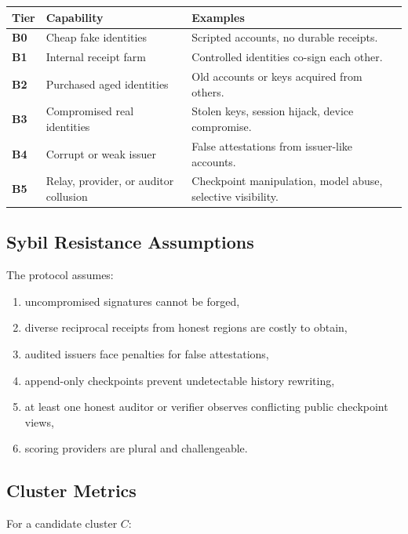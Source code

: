 \documentclass[11pt]{article}
\begin{document}
\begin{center}
\begin{tabularx}{\textwidth}{>{\bfseries}p{} p{} X}
\toprule
Tier & Capability & Examples \\
\midrule
B0 & Cheap fake identities & Scripted accounts, no durable receipts. \\
B1 & Internal receipt farm & Controlled identities co-sign each other. \\
B2 & Purchased aged identities & Old accounts or keys acquired from others. \\
B3 & Compromised real identities & Stolen keys, session hijack, device compromise. \\
B4 & Corrupt or weak issuer & False attestations from issuer-like accounts. \\
B5 & Relay, provider, or auditor collusion & Checkpoint manipulation, model abuse, selective visibility. \\
\bottomrule
\end{tabularx}
\end{center}

\subsection{Sybil Resistance Assumptions}

The protocol assumes:

\begin{enumerate}
    \item uncompromised signatures cannot be forged,
    \item diverse reciprocal receipts from honest regions are costly to obtain,
    \item audited issuers face penalties for false attestations,
    \item append-only checkpoints prevent undetectable history rewriting,
    \item at least one honest auditor or verifier observes conflicting public checkpoint views,
    \item scoring providers are plural and challengeable.
\end{enumerate}

\subsection{Cluster Metrics}

For a candidate cluster \(C\):
\end{document}
